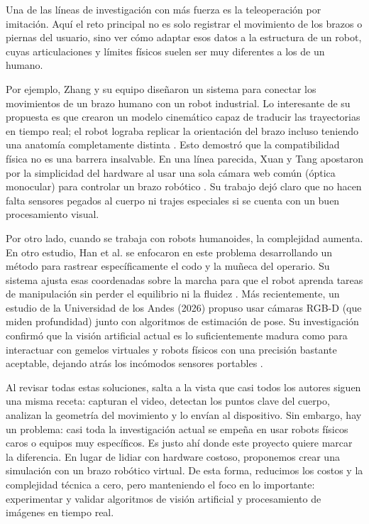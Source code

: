 Una de las líneas de investigación con más fuerza es la teleoperación por imitación. Aquí el reto principal no es solo registrar el movimiento de los brazos o piernas del usuario, sino ver cómo adaptar esos datos a la estructura de un robot, cuyas articulaciones y límites físicos suelen ser muy diferentes a los de un humano.

Por ejemplo, Zhang y su equipo diseñaron un sistema para conectar los movimientos de un brazo humano con un robot industrial. Lo interesante de su propuesta es que crearon un modelo cinemático capaz de traducir las trayectorias en tiempo real; el robot lograba replicar la orientación del brazo incluso teniendo una anatomía completamente distinta \cite{wang2020fast}. Esto demostró que la compatibilidad física no es una barrera insalvable. En una línea parecida, Xuan y Tang apostaron por la simplicidad del hardware al usar una sola cámara web común (óptica monocular) para controlar un brazo robótico \cite{xuan2017vision}. Su trabajo dejó claro que no hacen falta sensores pegados al cuerpo ni trajes especiales si se cuenta con un buen procesamiento visual.

Por otro lado, cuando se trabaja con robots humanoides, la complejidad aumenta. En otro estudio, Han et al. se enfocaron en este problema desarrollando un método para rastrear específicamente el codo y la muñeca del operario. Su sistema ajusta esas coordenadas sobre la marcha para que el robot aprenda tareas de manipulación sin perder el equilibrio ni la fluidez \cite{han2024robust}. Más recientemente, un estudio de la Universidad de los Andes (2026) propuso usar cámaras RGB-D (que miden profundidad) junto con algoritmos de estimación de pose. Su investigación confirmó que la visión artificial actual es lo suficientemente madura como para interactuar con gemelos virtuales y robots físicos con una precisión bastante aceptable, dejando atrás los incómodos sensores portables \cite{alibeigi2017inverse}.

Al revisar todas estas soluciones, salta a la vista que casi todos los autores siguen una misma receta: capturan el video, detectan los puntos clave del cuerpo, analizan la geometría del movimiento y lo envían al dispositivo. Sin embargo, hay un problema: casi toda la investigación actual se empeña en usar robots físicos caros o equipos muy específicos. Es justo ahí donde este proyecto quiere marcar la diferencia. En lugar de lidiar con hardware costoso, proponemos crear una simulación con un brazo robótico virtual. De esta forma, reducimos los costos y la complejidad técnica a cero, pero manteniendo el foco en lo importante: experimentar y validar algoritmos de visión artificial y procesamiento de imágenes en tiempo real.
